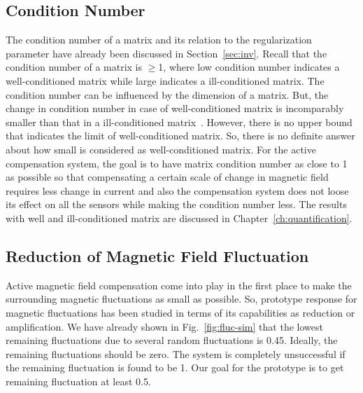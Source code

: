 \subsection{Condition Number}
The condition number of a matrix and its relation to the regularization parameter have already been discussed in Section~\ref{sec:inv}. Recall that the condition number of a matrix is $\geq$1, where low condition number indicates a well-conditioned matrix while large indicates a ill-conditioned matrix.  The condition number can be influenced by the dimension of a matrix. But, the change in condition number in case of  well-conditioned matrix is incomparably smaller than that in a ill-conditioned matrix~\cite{cond_m_size}. However, there is no upper bound that indicates the limit of well-conditioned matrix. So, there is no definite answer about how small is considered as well-conditioned matrix. For the active compensation system, the goal is to have matrix condition number as close to 1 as possible so that compensating a certain scale of change in magnetic field requires less change in current and also the compensation system does not loose its effect on all the sensors while making the condition number less. The results with well and ill-conditioned matrix are discussed in Chapter~\ref{ch:quantification}.


\subsection{Reduction of Magnetic Field Fluctuation}

Active magnetic field compensation come into play in the first place to make the surrounding magnetic fluctuations as small as possible. So, prototype response for magnetic fluctuations has been studied in terms of its capabilities as reduction or amplification. We have already shown in Fig.~\ref{fig:fluc-sim} that the lowest remaining fluctuations due to several random fluctuations is 0.45. Ideally, the remaining fluctuations should be zero. The system is completely unsuccessful if the remaining fluctuation is found to be 1. Our goal for the prototype is to get remaining fluctuation at least 0.5.


